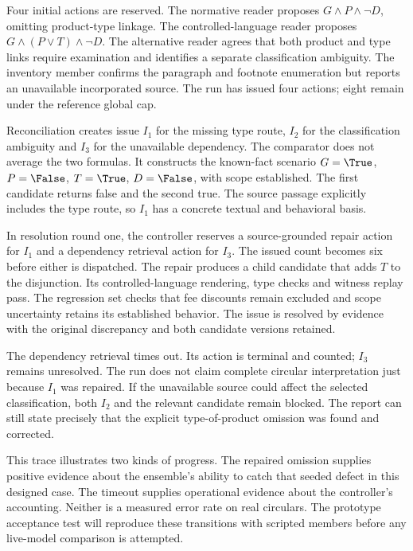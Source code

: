 Four initial actions are reserved. The normative reader proposes
$G\land P\land\neg D$, omitting product-type linkage. The controlled-language
reader proposes $G\land(P\lor T)\land\neg D$. The alternative reader agrees that
both product and type links require examination and identifies a separate
classification ambiguity. The inventory member confirms the paragraph and
footnote enumeration but reports an unavailable incorporated source. The run has
issued four actions; eight remain under the reference global cap.

Reconciliation creates issue $I_1$ for the missing type route, $I_2$ for the
classification ambiguity and $I_3$ for the unavailable dependency. The comparator
does not average the two formulas. It constructs the known-fact scenario
$G=\True$, $P=\False$, $T=\True$, $D=\False$, with scope established. The first
candidate returns false and the second true. The source passage explicitly
includes the type route, so $I_1$ has a concrete textual and behavioral basis.


In resolution round one, the controller reserves a source-grounded repair action
for $I_1$ and a dependency retrieval action for $I_3$. The issued count becomes
six before either is dispatched. The repair produces a child candidate that adds
$T$ to the disjunction. Its controlled-language rendering, type checks and witness
replay pass. The regression set checks that fee discounts remain excluded and
scope uncertainty retains its established behavior. The issue is resolved by
evidence with the original discrepancy and both candidate versions retained.

The dependency retrieval times out. Its action is terminal and counted; $I_3$
remains unresolved. The run does not claim complete circular interpretation just
because $I_1$ was repaired. If the unavailable source could affect the selected
classification, both $I_2$ and the relevant candidate remain blocked. The report
can still state precisely that the explicit type-of-product omission was found
and corrected.

This trace illustrates two kinds of progress. The repaired omission supplies
positive evidence about the ensemble's ability to catch that seeded defect in
this designed case. The timeout supplies operational evidence about the
controller's accounting. Neither is a measured error rate on real circulars.
The prototype acceptance test will reproduce these transitions with scripted
members before any live-model comparison is attempted.

